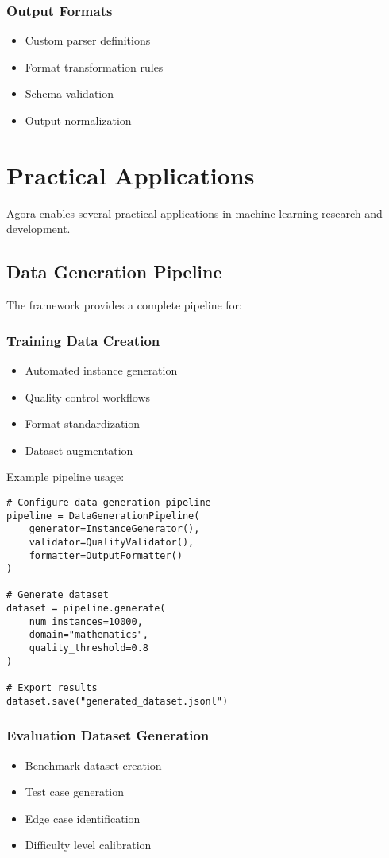 \documentclass[10pt,conference]{IEEEtran}
\begin{document}
\subsubsection{Output Formats}
\begin{itemize}
    \item Custom parser definitions
    \item Format transformation rules
    \item Schema validation
    \item Output normalization
\end{itemize}

\section{Practical Applications}
Agora enables several practical applications in machine learning research and development.

\subsection{Data Generation Pipeline}
The framework provides a complete pipeline for:

\subsubsection{Training Data Creation}
\begin{itemize}
    \item Automated instance generation
    \item Quality control workflows
    \item Format standardization
    \item Dataset augmentation
\end{itemize}

Example pipeline usage:
\begin{lstlisting}
# Configure data generation pipeline
pipeline = DataGenerationPipeline(
    generator=InstanceGenerator(),
    validator=QualityValidator(),
    formatter=OutputFormatter()
)

# Generate dataset
dataset = pipeline.generate(
    num_instances=10000,
    domain="mathematics",
    quality_threshold=0.8
)

# Export results
dataset.save("generated_dataset.jsonl")
\end{lstlisting}

\subsubsection{Evaluation Dataset Generation}
\begin{itemize}
    \item Benchmark dataset creation
    \item Test case generation
    \item Edge case identification
    \item Difficulty level calibration
\end{itemize}
\end{document}
